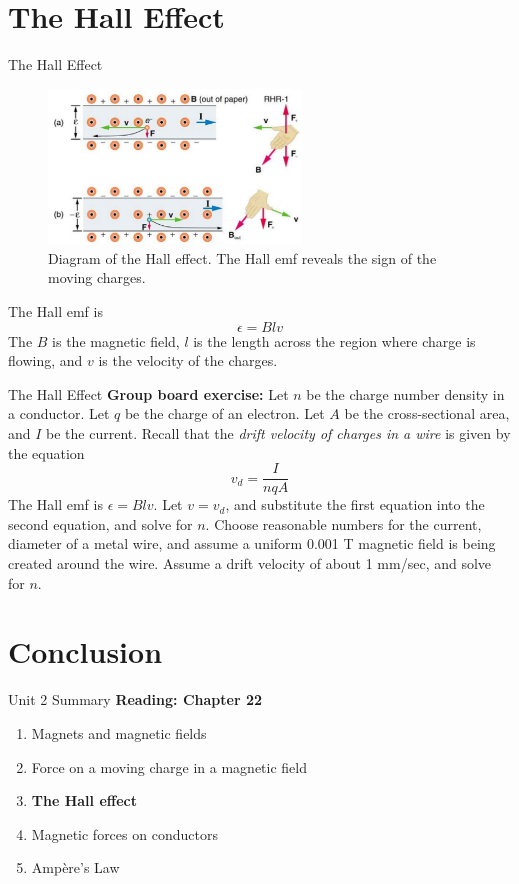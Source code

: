 \documentclass{beamer}
\begin{document}
\section{The Hall Effect}

\begin{frame}{The Hall Effect}
\begin{figure}
\centering
\includegraphics[width=0.6\textwidth]{figures/hall.png}
\caption{\label{fig:hall} Diagram of the Hall effect.  The Hall emf reveals the sign of the moving charges.}
\end{figure}
The Hall emf is 
\begin{equation}
\epsilon = Blv
\end{equation}
The $B$ is the magnetic field, $l$ is the length across the region where charge is flowing, and $v$ is the velocity of the charges.
\end{frame}

\begin{frame}{The Hall Effect}
\textbf{Group board exercise:} Let $n$ be the charge number density in a conductor.  Let $q$ be the charge of an electron.  Let $A$ be the cross-sectional area, and $I$ be the current.  Recall that the \textit{drift velocity of charges in a wire} is given by the equation
\begin{equation}
v_d = \frac{I}{nqA}
\end{equation}
The Hall emf is $\epsilon = Blv$.  Let $v = v_d$, and substitute the first equation into the second equation, and solve for $n$.  Choose reasonable numbers for the current, diameter of a metal wire, and assume a uniform 0.001 T magnetic field is being created around the wire.  Assume a drift velocity of about 1 mm/sec, and solve for $n$.
\end{frame}

\section{Conclusion}

\begin{frame}{Unit 2 Summary}
\textbf{Reading: Chapter 22}
\begin{enumerate}
\item Magnets and magnetic fields
\item Force on a moving charge in a magnetic field
\item \textbf{The Hall effect}
\item Magnetic forces on conductors
\item \alert{Amp\`{e}re's Law}
\end{enumerate}
\end{frame}
\end{document}

